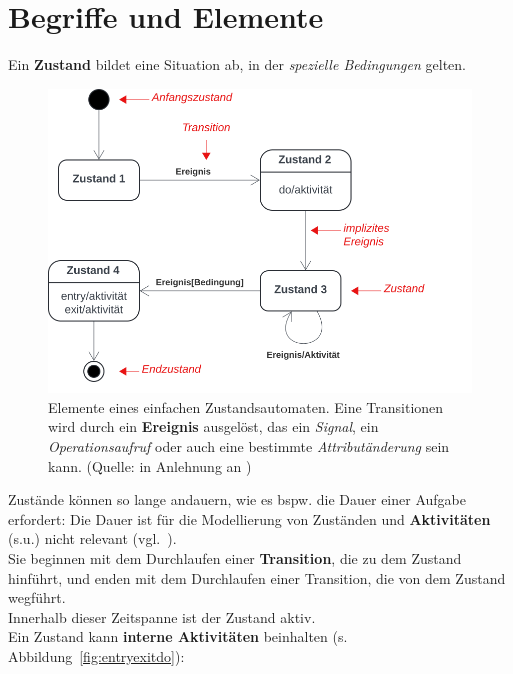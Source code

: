 \section{Begriffe und Elemente}

Ein \textbf{Zustand} bildet eine Situation ab, in der \textit{spezielle Bedingungen} gelten.\\

\begin{figure}
    \centering
    \includegraphics[scale=0.4]{part three/Zustandsautomaten/img/statechartdiagramnotation}
    \caption{Elemente eines einfachen Zustandsautomaten. Eine Transitionen wird durch ein \textbf{Ereignis} ausgelöst, das ein \textit{Signal}, ein \textit{Operationsaufruf} oder auch eine bestimmte \textit{Attributänderung} sein kann. (Quelle: in Anlehnung an \cite[90, Abb. 2.11-6]{Bal05})}
    \label{fig:statechartdiagramnotation}
\end{figure}



\noindent
Zustände können so lange andauern, wie es bspw. die Dauer einer Aufgabe erfordert: Die Dauer ist für die Modellierung von Zuständen und \textbf{Aktivitäten} (s.u.) nicht relevant (vgl.~\cite[88]{Bal05}). \\

\noindent
Sie beginnen mit dem Durchlaufen einer \textbf{Transition}, die zu dem Zustand hinführt, und enden mit dem Durchlaufen einer Transition, die von dem Zustand wegführt.\\
Innerhalb dieser Zeitspanne ist der Zustand aktiv.\\

\noindent
Ein Zustand kann \textbf{interne Aktivitäten} beinhalten (s. Abbildung~\ref{fig:entryexitdo}):

